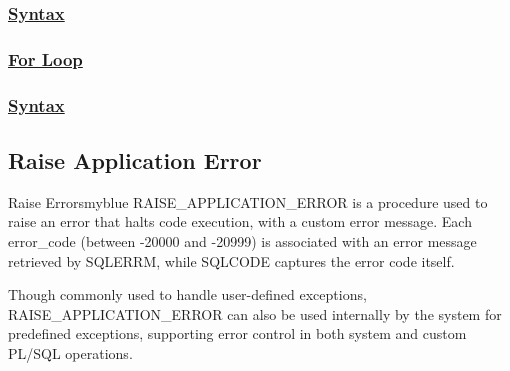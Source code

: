 \subsubsection*{\underline{Syntax}}





\vspace{0.25cm}



\subsubsection*{\underline{For Loop}}

\subsubsection*{\underline{Syntax}}




\vspace{0.5cm}

\subsection{Raise Application Error}
\begin{prettyBox}{Raise Errors}{myblue}
RAISE\_APPLICATION\_ERROR is a procedure used to raise an error that halts code execution, with a custom error
message. Each error\_code (between -20000 and -20999) is associated with an error message retrieved 
by SQLERRM, while SQLCODE captures the error code itself.

\vspace{0.25cm}




\vspace{0.25cm}


Though commonly used to handle user-defined exceptions, RAISE\_APPLICATION\_ERROR can also be used internally
by the system for predefined exceptions, supporting error control in both system and custom PL/SQL operations.
\end{prettyBox}


